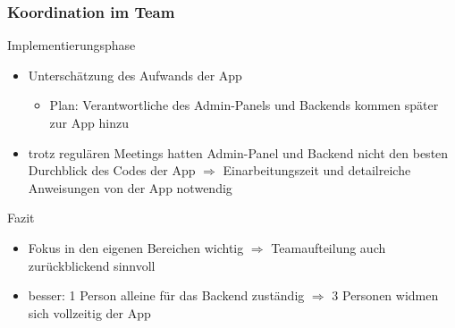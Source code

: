 \begin{frame}\frametitle{Koordination im Team}
   	\begin{tcolorbox}[width=.9\textwidth]
   	Implementierungsphase
   		\begin{itemize}
   		\item Unterschätzung des Aufwands der App
   		\begin{itemize}
   			\item Plan: Verantwortliche des Admin-Panels und Backends kommen später zur App hinzu
   		\end{itemize}
   		\item trotz regulären Meetings hatten Admin-Panel und Backend nicht den besten Durchblick des Codes der App $\Rightarrow$ Einarbeitungszeit und detailreiche Anweisungen von der App notwendig
   	\end{itemize}
    \end{tcolorbox}
    Fazit
    \begin{itemize}
        	\item Fokus in den eigenen Bereichen wichtig $\Rightarrow$ Teamaufteilung auch zurückblickend sinnvoll
        	\item besser: 1 Person alleine für das Backend zuständig $\Rightarrow$ 3 Personen widmen sich vollzeitig der App
    \end{itemize}
\end{frame}
